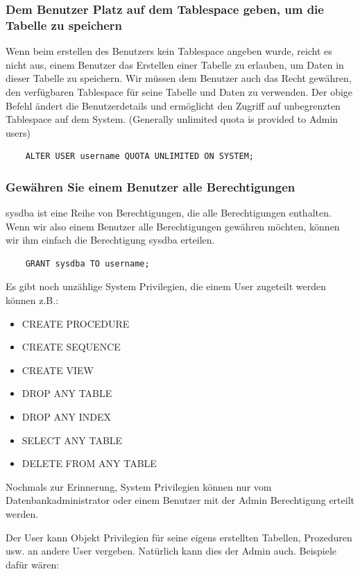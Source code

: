 \subsubsection{Dem Benutzer Platz auf dem Tablespace geben, um die Tabelle zu speichern}
Wenn beim erstellen des Benutzers kein Tablespace angeben wurde, reicht es nicht aus, einem Benutzer das Erstellen einer Tabelle zu erlauben, um Daten in dieser Tabelle zu speichern. Wir müssen dem Benutzer auch das Recht gewähren, den verfügbaren Tablespace für seine Tabelle und Daten zu verwenden. Der obige Befehl ändert die Benutzerdetails und ermöglicht den Zugriff auf unbegrenzten Tablespace auf dem System. (Generally unlimited quota is provided to Admin users)

\begin{lstlisting}
    ALTER USER username QUOTA UNLIMITED ON SYSTEM;
\end{lstlisting}

\subsubsection{Gewähren Sie einem Benutzer alle Berechtigungen}
sysdba ist eine Reihe von Berechtigungen, die alle Berechtigungen enthalten. Wenn wir also einem Benutzer alle Berechtigungen gewähren möchten, können wir ihm einfach die Berechtigung sysdba erteilen.

\begin{lstlisting}
    GRANT sysdba TO username;
\end{lstlisting}

Es gibt noch unzählige System Privilegien, die einem User zugeteilt werden können z.B.:

\begin{itemize}
    \item CREATE PROCEDURE
    \item CREATE SEQUENCE
    \item CREATE VIEW
    \item DROP ANY TABLE
    \item DROP ANY INDEX
    \item SELECT ANY TABLE
    \item DELETE FROM ANY TABLE
\end{itemize}

Nochmals zur Erinnerung, System Privilegien können nur vom Datenbankadministrator oder einem Benutzer mit der Admin Berechtigung erteilt werden.

Der User kann Objekt Privilegien für seine eigens erstellten Tabellen, Prozeduren usw. an andere User vergeben. Natürlich kann dies der Admin auch.
Beispiele dafür wären:

